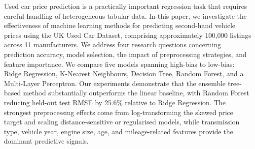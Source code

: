 Used car price prediction is a practically important regression task that requires careful handling of heterogeneous tabular data.
In this paper, we investigate the effectiveness of machine learning methods for predicting second-hand vehicle prices using the UK Used Car Dataset, comprising approximately 100{,}000 listings across 11 manufacturers.
We address four research questions concerning prediction accuracy, model selection, the impact of preprocessing strategies, and feature importance.
We compare five models spanning high-bias to low-bias: Ridge Regression, K-Nearest Neighbours, Decision Tree, Random Forest, and a Multi-Layer Perceptron.
Our experiments demonstrate that the ensemble tree-based method substantially outperforms the linear baseline, with Random Forest reducing held-out test RMSE by 25.6\% relative to Ridge Regression.
The strongest preprocessing effects come from log-transforming the skewed price target and scaling distance-sensitive or regularised models, while transmission type, vehicle year, engine size, age, and mileage-related features provide the dominant predictive signals.
